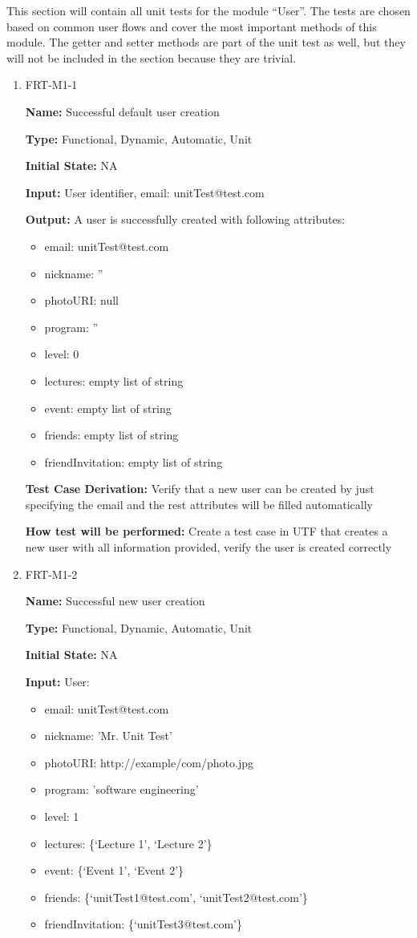 \documentclass[12pt, titlepage]{article}
\begin{document}
This section will contain all unit tests for the module ``User''. The tests are chosen based on common user flows and cover the most important methods of this module. The getter and setter methods are part of the unit test as well, but they will not be included in the section because they are trivial.

\begin{enumerate}

\item{FRT-M1-1}

\textbf{Name:} Successful default user creation

\textbf{Type:} Functional, Dynamic, Automatic, Unit
					
\textbf{Initial State:} NA
					
\textbf{Input:} User identifier, email: unitTest@test.com
					
\textbf{Output:} A user is successfully created with following attributes:
\begin{itemize}
\item email: unitTest@test.com
\item nickname: ''
\item photoURI: null
\item program: ''
\item level: 0
\item lectures: empty list of string
\item event: empty list of string
\item friends: empty list of string
\item friendInvitation: empty list of string
\end{itemize}

\textbf{Test Case Derivation:} Verify that a new user can be created by just specifying the email and the rest attributes will be filled automatically

\textbf{How test will be performed:} Create a test case in UTF that creates a new user with all information provided, verify the user is created correctly

\item{FRT-M1-2}

\textbf{Name:} Successful new user creation

\textbf{Type:} Functional, Dynamic, Automatic, Unit
					
\textbf{Initial State:} NA
					
\textbf{Input:} User:
\begin{itemize}
\item email: unitTest@test.com
\item nickname: 'Mr. Unit Test'
\item photoURI: http://example/com/photo.jpg
\item program: 'software engineering'
\item level: 1
\item lectures: \{`Lecture 1', `Lecture 2'\}
\item event: \{`Event 1', `Event 2'\}
\item friends: \{`unitTest1@test.com', `unitTest2@test.com'\}
\item friendInvitation: \{`unitTest3@test.com'\}
\end{itemize}
					

\end{enumerate}
\end{document}
